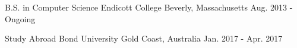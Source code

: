 

\begin{cventries}

  \cventry
    {B.S. in Computer Science} %
    {Endicott College} %
    {Beverly, Massachusetts} %
    {Aug. 2013 - Ongoing} %
    {}
    
  \cventry
    {Study Abroad} %
    {Bond University} %
    {Gold Coast, Australia} %
    {Jan. 2017 - Apr. 2017} %
    {}

\end{cventries}
